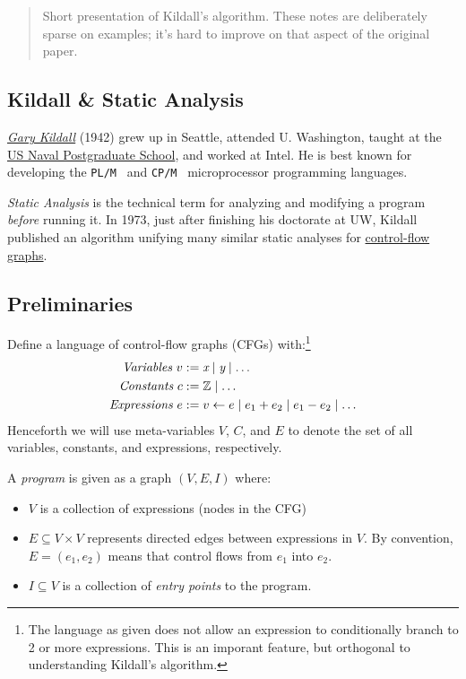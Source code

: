 \documentclass{article}
\begin{document}
\begin{abstract}
  Short presentation of Kildall's algorithm.
  These notes are deliberately sparse on examples; it's hard to improve on that aspect of the original paper.
\end{abstract}

\subsection*{Kildall \& Static Analysis}
\href{https://en.wikipedia.org/wiki/Gary_Kildall}{\emph{Gary Kildall}} (1942) grew up in Seattle, attended U. Washington, taught at the \href{http://www.nps.edu/}{US Naval Postgraduate School}, and worked at Intel.
He is best known for developing the {\tt PL/M}~\cite{plm} and {\tt CP/M}~\cite{cpm} microprocessor programming languages.

\emph{Static Analysis} is the technical term for analyzing and modifying a program \emph{before} running it.
In 1973, just after finishing his doctorate at UW, Kildall published an algorithm unifying many similar static analyses for \href{http://www.cs.cornell.edu/courses/cs412/2008sp/lectures/lec24.pdf}{control-flow graphs}.


\subsection*{Preliminaries}
Define a language of control-flow graphs (CFGs) with:\footnote{The language as given
 does not allow an expression to conditionally branch to 2 or more expressions.
 This is an imporant feature, but orthogonal to understanding Kildall's algorithm.}
\begin{align*}
  \emph{Variables}  ~v &:= \emph{x}
                           \mid \emph{y}
                           \mid \ldots
\\\emph{Constants}  ~c &:= \mathbb{Z}
                           \mid \ldots
\\\emph{Expressions}~e &:= v \leftarrow e
                             \mid e_1 + e_2
                             \mid e_1 - e_2
                             \mid \ldots
\end{align*}
Henceforth we will use meta-variables $V$, $C$, and $E$ to denote the set of all variables, constants, and expressions, respectively.

A \emph{program} is given as a graph $(V, E, I)$ where:
\begin{itemize}
\item
  $V$ is a collection of expressions (nodes in the CFG)
\item
  $E \subseteq V \times V$ represents directed edges between expressions in $V$.
  By convention, $E = (e_1, e_2)$ means that control flows from $e_1$ into $e_2$.
\item
  $I \subseteq V$ is a collection of \emph{entry points} to the program.
\end{itemize}
\end{document}
